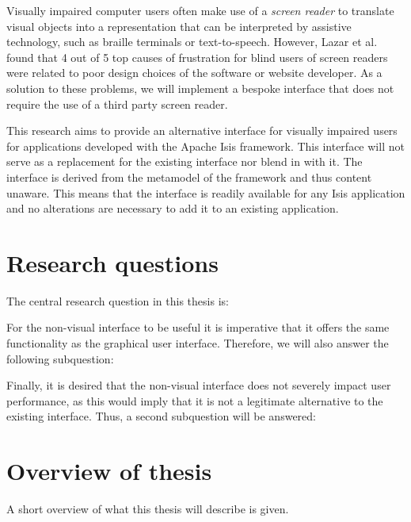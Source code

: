 Visually impaired computer users often make use of a \textit{screen reader} to translate visual objects into a representation that can be interpreted by assistive technology, such as braille terminals or text-to-speech. However, Lazar et al. found that 4 out of 5 top causes of frustration for blind users of screen readers were related to poor design choices of the software or website developer\cite{lazar2007frustrates}. As a solution to these problems, we will implement a bespoke interface that does not require the use of a third party screen reader.

This research aims to provide an alternative interface for visually impaired users for applications developed with the Apache Isis\cite{Apach60:online} framework. This interface will not serve as a replacement for the existing interface nor blend in with it. The interface is derived from the metamodel of the framework and thus content unaware. This means that the interface is readily available for any Isis application and no alterations are necessary to add it to an existing application.

\section{Research questions}
\label{section:researchquestions}
The central research question in this thesis is:

 \label{RQ1}

\noindent For the non-visual interface to be useful it is imperative that it offers the same functionality as the graphical user interface. Therefore, we will also answer the following subquestion:

 \label{RQ2}

\noindent Finally, it is desired that the non-visual interface does not severely impact user performance, as this would imply that it is not a legitimate alternative to the existing interface. Thus, a second subquestion will be answered:

 \label{RQ3}

\section{Overview of thesis}
\label{section:overviewofthesis}
A short overview of what this thesis will describe is given.